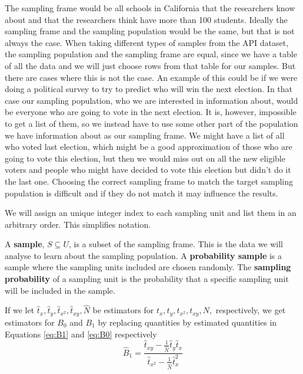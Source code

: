 \documentclass{article}
\begin{document}
The sampling frame would be all schools in California that the researchers know
about and that the researchers think have more than 100 students.
Ideally the sampling frame and the sampling population would be the same, but that is not always the case.
When taking different types of samples from the API dataset, the sampling population and the sampling frame are equal, since
we have a table of all the data and we will just choose rows from that table for
our samples. But there are cases where this is not the case. An example of this
could be if we were doing a political survey to try to predict who will win the
next election.
In that case our sampling population, who we are interested in information
about, would be everyone who are going to vote in the next election. It is, however,
impossible to get a list of them, so we instead have to use 
some other part of the population we have information about as our sampling frame. We might have a
list of all who voted last election, which might be a good approximation of
those who are going to vote this election, but then we would miss out on all the
new eligible voters and people who might have decided to vote this election but
didn't do it the last one.
Choosing the correct sampling frame to match the target sampling population is
difficult and if they do not match it may influence the results.

We will assign an unique integer index to each sampling unit and list them in an arbitrary order. This simplifies notation.


\begin{definition} \label{def:sample}
A \textbf{sample}, \(S \subseteq U\), is a subset of the sampling frame. This is the data we will analyse to learn about the sampling population.
A \textbf{probability sample} is a sample where the sampling units included are chosen randomly.
The \textbf{sampling probability} of a sampling unit is the probability that a
specific sampling unit will be included in the sample.
\end{definition}


If we let \(\hat{t}_x, \hat{t}_y, \hat{t}_{x^2}, \hat{t}_{xy}, \hat{N}\) be estimators
for \(t_x, t_y, t_{x^2},
t_{xy}, N,\) respectively, we get estimators for \(B_0\) and \(B_1\) by
replacing quantities by estimated quantities in Equations \ref{eq:B1} and
\ref{eq:B0} respectively
\begin{equation*}
 \hat{B}_1 = \frac{\hat{t}_{xy} - \frac{1}{\widehat{N}} \hat{t}_y \hat{t}_x}
   {\hat{t}_{x^2} - \frac{1}{\widehat{N}} \hat{t}_x^2}
\end{equation*}
\end{document}
